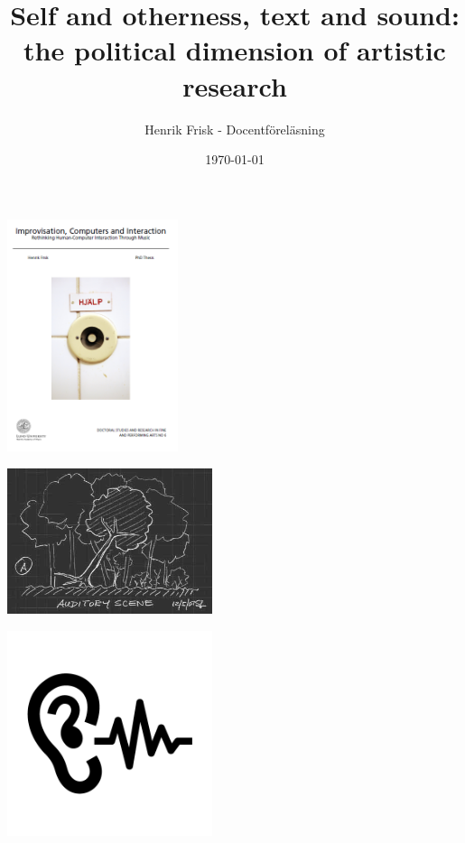 \documentclass{beamer}
\title[Self and otherness]{Self and otherness, text and sound: the political dimension of artistic research} %
\author{Henrik Frisk - Docentföreläsning} %
\institute[MHM] %
{
Lunds Universitet \\ %
\medskip
\textit{henrik.frisk@mhm.lu.se} %
}
\date{\today} %
\begin{document}
\begin{frame}
\titlepage %
\end{frame}

\begin{frame}
\begin{center}
  \includegraphics[width=5cm]{./img/front-thesis.png}
\end{center}
\end{frame}

\begin{frame}
  \begin{center}
    \vspace{.2cm}
    \includegraphics[width=6cm]{./img/tree.jpg}
  \end{center}
\end{frame}

\begin{frame}
  \begin{center}
    \vspace{.2cm}
    \includegraphics[width=6cm]{./img/listen.png}
  \end{center}
\end{frame}
\end{document}
